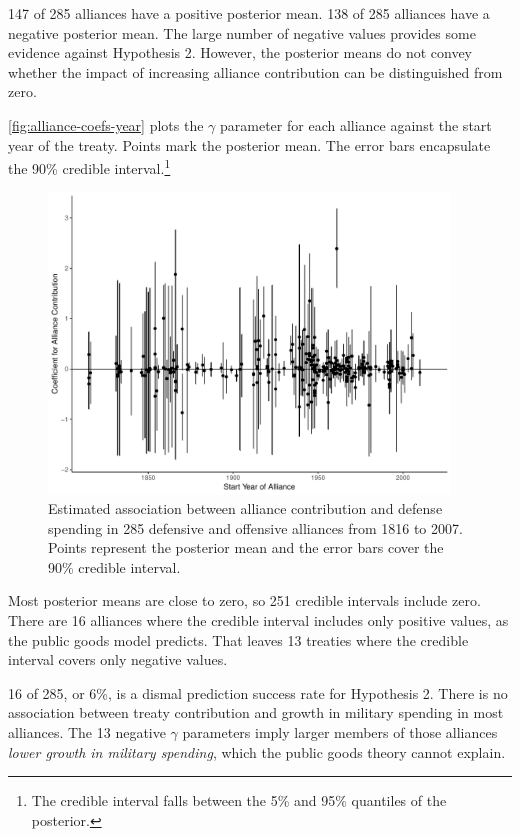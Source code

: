 \documentclass[12pt]{article}
\begin{document}
147 of 285 alliances have a positive posterior mean. 
138 of 285 alliances have a negative posterior mean. 
The large number of negative values provides some evidence against Hypothesis 2. 
However, the posterior means do not convey whether the impact of increasing alliance contribution can be distinguished from zero. 


\autoref{fig:alliance-coefs-year} plots the $\gamma$ parameter for each alliance against the start year of the treaty.
Points mark the posterior mean. 
The error bars encapsulate the 90\% credible interval.\footnote{The credible interval falls between the 5\% and 95\% quantiles of the posterior.}  


\begin{figure}[htbp]
	\centering
		\includegraphics[width=0.95\textwidth]{alliance-coefs-year.pdf}
	\caption{Estimated association between alliance contribution and defense spending in 285 defensive and offensive alliances from 1816 to 2007. Points represent the posterior mean and the error bars cover the 90\% credible interval.}
	\label{fig:alliance-coefs-year}
\end{figure}


Most posterior means are close to zero, so 251 credible intervals include zero. 
There are 16 alliances where the credible interval includes only positive values, as the public goods model predicts. 
That leaves 13 treaties where the credible interval covers only negative values. 


16 of 285, or 6\%, is a dismal prediction success rate for Hypothesis 2. 
There is no association between treaty contribution and growth in military spending in most alliances.
The 13 negative $\gamma$ parameters imply larger members of those alliances \emph{lower growth in military spending}, which the public goods theory cannot explain. 
\end{document}

